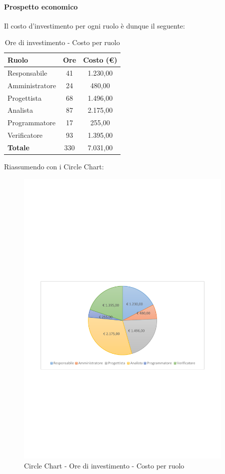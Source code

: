 \documentclass[../PianoProgetto.tex]{subfiles}
\begin{document}
	\paragraph{Prospetto economico}
					Il costo d'investimento per ogni ruolo è dunque il seguente:
	\begin{table}[h]
		\centering
		\begin{tabular}{l * {2}{c}}
			\toprule
			\textbf{Ruolo} & \textbf{Ore} & \textbf{Costo (\euro{})} \\
			\midrule
			Responsabile &	41 &  1.230,00 \\
			Amministratore & 24 & 480,00 \\
			Progettista & 68 & 1.496,00 \\
			Analista & 87 & 2.175,00 \\
			Programmatore & 17 & 255,00 \\
			Verificatore & 93 & 1.395,00 \\
			\midrule		
			\textbf{Totale} & 330 & 7.031,00 \\
			\bottomrule
		\end{tabular}
		\caption{Ore di investimento - Costo per ruolo}
		\label{tab:investimento_costo}
	\end{table}
\vfill	
	Riassumendo con i Circle Chart:

	\begin{figure}[!h]
		\centering
		\includegraphics[width=0.93\textwidth , trim=2cm 9.5cm 2cm 11cm]{grafici/Riepilogo/Investimento/costo}
			\caption{Circle Chart - Ore di investimento - Costo per ruolo}
		\label{fig:CircleChart-investimento_costo}
	\end{figure}
\vfill	
\newpage
\end{document}
